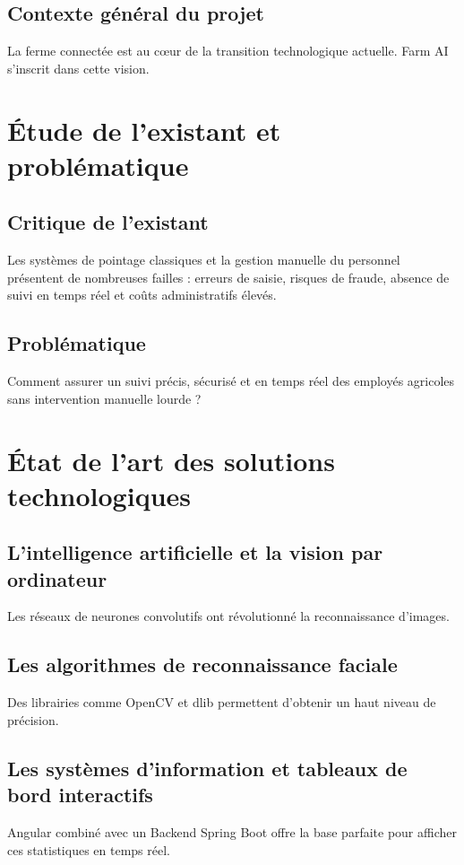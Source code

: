 \documentclass[12pt,a4paper]{report}
\begin{document}
\subsection{Contexte général du projet}
La ferme connectée est au cœur de la transition technologique actuelle. Farm AI s'inscrit dans cette vision.

\section{Étude de l'existant et problématique}

\subsection{Critique de l'existant}
Les systèmes de pointage classiques et la gestion manuelle du personnel présentent de nombreuses
failles : erreurs de saisie, risques de fraude, absence de suivi en temps réel et coûts
administratifs élevés.

\subsection{Problématique}
Comment assurer un suivi précis, sécurisé et en temps réel des employés agricoles sans intervention
manuelle lourde ?

\section{État de l'art des solutions technologiques}

\subsection{L'intelligence artificielle et la vision par ordinateur}
Les réseaux de neurones convolutifs ont révolutionné la reconnaissance d'images.

\subsection{Les algorithmes de reconnaissance faciale}
Des librairies comme OpenCV et dlib permettent d'obtenir un haut niveau de précision.

\subsection{Les systèmes d'information et tableaux de bord interactifs}
Angular combiné avec un Backend Spring Boot offre la base parfaite pour afficher ces statistiques en temps réel.
\end{document}
